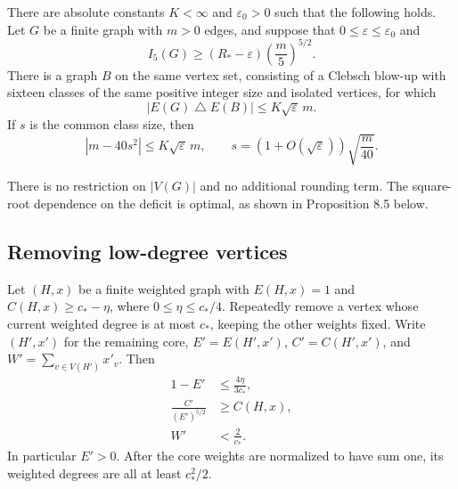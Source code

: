 \begin{theorem}\label{thm:edge-stability}
There are absolute constants $K<\infty$ and $\varepsilon_0>0$ such that the
following holds. Let $G$ be a finite graph with $m>0$ edges, and suppose that
$0\leq\varepsilon\leq\varepsilon_0$ and
\[
 I_5(G)\geq(R_\ast-\varepsilon)\left(\frac m5\right)^{5/2}.
\]
There is a graph $B$ on the same vertex set, consisting of a Clebsch blow-up
with sixteen classes of the same positive integer size and isolated
vertices, for which
\[
 |E(G)\mathbin{\triangle}E(B)|\leq K\sqrt\varepsilon\,m.
\]
If $s$ is the common class size, then
\[
 |m-40s^2|\leq K\sqrt\varepsilon\,m,\qquad
 s=(1+O(\sqrt\varepsilon))\sqrt{\frac m{40}}.
\]
\end{theorem}

There is no restriction on $|V(G)|$ and no additional rounding term. The
square-root dependence on the deficit is optimal, as shown in Proposition
8.5 below.

\subsection{Removing low-degree vertices}

\begin{lemma}\label{lem:peeling}
Let $(H,x)$ be a finite weighted graph with $E(H,x)=1$ and
$C(H,x)\geq c_\ast-\eta$, where $0\leq\eta\leq c_\ast/4$. Repeatedly remove
a vertex whose current weighted degree is at most $c_\ast$, keeping the
other weights fixed. Write $(H',x')$ for the remaining core,
$E'=E(H',x')$, $C'=C(H',x')$, and
$W'=\sum_{v\in V(H')}x'_v$. Then
\begin{align}
 1-E'&\leq\frac{4\eta}{3c_\ast},\tag{37}\label{eq:37}\\
 \frac{C'}{(E')^{5/2}}&\geq C(H,x),\tag{38}\label{eq:38}\\
 W'&<\frac2{c_\ast}.\tag{39}\label{eq:39}
\end{align}
In particular $E'>0$. After the core weights are normalized to have sum one,
its weighted degrees are all at least $c_\ast^2/2$.
\end{lemma}

